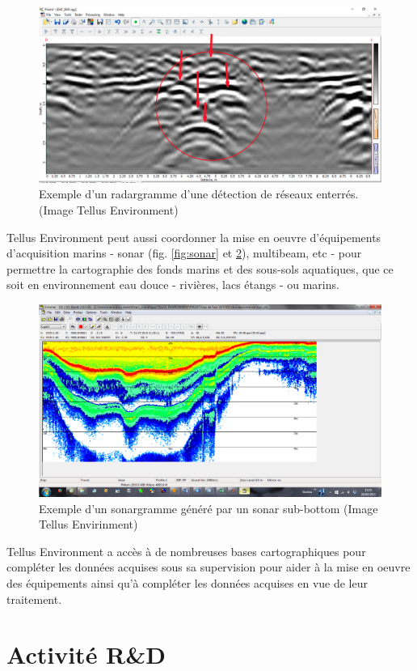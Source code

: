 \documentclass[12pt,a4paper]{report}
\begin{document}
	\begin{figure}
		\centering
		\includegraphics[width=0.7\linewidth]{img/radargram}
		\caption[radargramme]{Exemple d'un radargramme d'une détection \hspace{\textwidth} de réseaux enterrés. (Image Tellus Environment)}
		\label{fig:radargram}
	\end{figure}
	
	\para Tellus Environment peut aussi coordonner la mise en oeuvre d'équipements d'acquisition marins - sonar (fig. \ref{fig:sonar} et \ref{fig:e1790}), multibeam, etc - pour permettre la cartographie des fonds marins et des sous-sols aquatiques, que ce soit en environnement eau douce - rivières, lacs étangs - ou marins. 
	
	\begin{figure}
		\centering
		\includegraphics[width=0.7\linewidth]{img/E1790}
		\caption[sonargramme]{Exemple d'un sonargramme généré par un sonar sub-bottom (Image Tellus Envirinment)}
		\label{fig:e1790}
	\end{figure}
	
	\para Tellus Environment a accès à de nombreuses bases cartographiques pour compléter les données acquises sous sa supervision pour aider à la mise en oeuvre des équipements ainsi qu'à compléter les données acquises en vue de leur traitement.



	\section{Activité R\&D}
	
\end{document}
